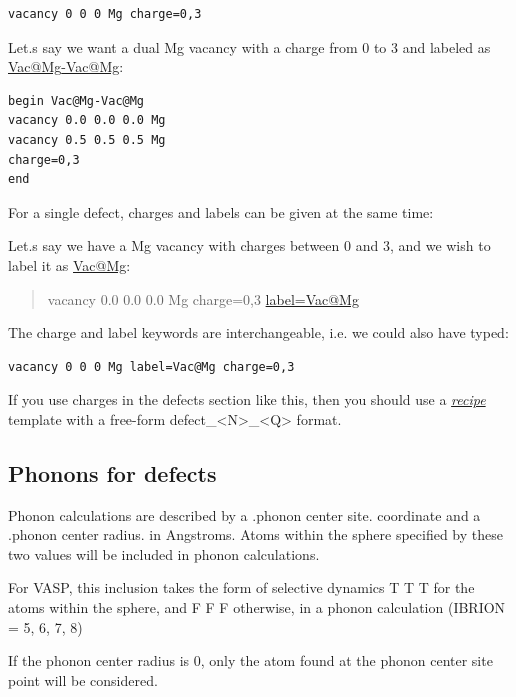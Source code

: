 \documentclass[letterpaper,10pt,english]{sphinxmanual}
\begin{document}
\begin{Verbatim}[commandchars=\\\{\}]
vacancy 0 0 0 Mg charge=0,3
\end{Verbatim}

Let.s say we want a dual Mg vacancy with a charge from 0 to 3 and labeled as \href{mailto:Vac@Mg}{Vac@Mg}\href{mailto:-Vac@Mg}{-Vac@Mg}:

\begin{Verbatim}[commandchars=\\\{\}]
begin Vac@Mg-Vac@Mg
vacancy 0.0 0.0 0.0 Mg
vacancy 0.5 0.5 0.5 Mg
charge=0,3
end
\end{Verbatim}

For a single defect, charges and labels can be given at the same time:

Let.s say we have a Mg vacancy with charges between 0 and 3, and we wish to label it as \href{mailto:Vac@Mg}{Vac@Mg}:
\begin{quote}

vacancy 0.0 0.0 0.0 Mg charge=0,3 \href{mailto:label=Vac@Mg}{label=Vac@Mg}
\end{quote}

The charge and label keywords are interchangeable, i.e. we could also have typed:

\begin{Verbatim}[commandchars=\\\{\}]
vacancy 0 0 0 Mg label=Vac@Mg charge=0,3
\end{Verbatim}

If you use charges in the defects section like this, then you should use a {\hyperref[4_0_recipe::doc]{\emph{recipe}}} template with a free-form defect\_\textless{}N\textgreater{}\_\textless{}Q\textgreater{} format.


\subsection{Phonons for defects}
\label{3_0_inputfile:phonons-for-defects}
Phonon calculations are described by a .phonon center site. coordinate and a .phonon center radius. in Angstroms. Atoms within the sphere specified by these two values will be included in phonon calculations.

For VASP, this inclusion takes the form of selective dynamics T T T for the atoms within the sphere, and F F F otherwise, in a phonon calculation (IBRION = 5, 6, 7, 8)

If the phonon center radius is 0, only the atom found at the phonon center site point will be considered.
\end{document}
